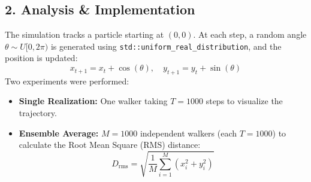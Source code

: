 \documentclass{article}
\begin{document}
\subsection*{2. Analysis \& Implementation}
The simulation tracks a particle starting at $(0,0)$. At each step, a random angle $\theta \sim U[0, 2\pi)$ is generated using \texttt{std::uniform\_real\_distribution}, and the position is updated:
\begin{equation}
    x_{t+1} = x_t + \cos(\theta), \quad y_{t+1} = y_t + \sin(\theta)
\end{equation}
Two experiments were performed:
\begin{itemize}
    \item \textbf{Single Realization:} One walker taking $T=1000$ steps to visualize the trajectory.
    \item \textbf{Ensemble Average:} $M=1000$ independent walkers (each $T=1000$) to calculate the Root Mean Square (RMS) distance:
    \begin{equation}
        D_{\text{rms}} = \sqrt{\frac{1}{M} \sum_{i=1}^{M} (x_i^2 + y_i^2)}
    \end{equation}
\end{itemize}
\end{document}

